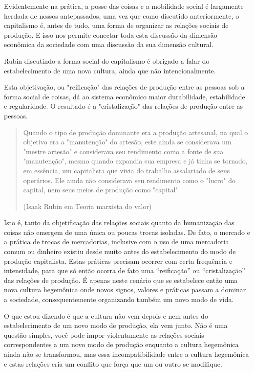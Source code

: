 Evidentemente na prática, a posse das coisas e a mobilidade social é largamente herdada de nossos antepassados, uma vez que como discutido anteriormente, o capitalismo é, antes de tudo, uma forma de organizar as relações sociais de produção. E isso nos permite conectar toda esta discussão da dimensão econômica da sociedade com uma discussão da sua dimensão cultural.

Rubin discutindo a forma social do capitalismo é obrigado a falar do estabelecimento de uma nova cultura, ainda que não intencionalmente.

Esta objetivação, ou "reificação" das relações de produção entre as pessoas sob a forma social de coisas, dá ao sistema econômico maior durabilidade, estabilidade e regularidade. O resultado é a "cristalização" das relações de produção entre as pessoas.

\begin{quote}
Quando o tipo de produção dominante era a produção artesanal, na qual o objetivo era a "manutenção" do artesão, este ainda se considerava um "mestre artesão" e considerava seu rendimento como a fonte de sua "manutenção", mesmo quando expandia sua empresa e já tinha se tornado, em essência, um capitalista que vivia do trabalho assalariado de seus operários. Ele ainda não considerava seu rendimento como o "lucro" do capital, nem seus meios de produção como "capital".

(Isaak Rubin em Teoria marxista do valor)
\end{quote}

Isto é, tanto da objetificação das relações sociais quanto da humanização das coisas não emergem de uma única ou poucas trocas isoladas. De fato, o mercado e a prática de trocas de mercadorias, inclusive com o uso de uma mercadoria comum ou dinheiro existiu desde muito antes do estabelecimento do modo de produção capitalista. Estas práticas precisam ocorrer com certa frequência e intensidade, para que só então ocorra de fato uma “reificação” ou “cristalização” das relações de produção. É apenas neste cenário que se estabelece então uma nova cultura hegemônica onde novos signos, valores e práticas passam a dominar a sociedade, consequentemente organizando também um novo modo de vida.

O que estou dizendo é que a cultura não vem depois e nem antes do estabelecimento de um novo modo de produção, ela vem junto. Não é uma questão simples, você pode impor violentamente as relações sociais correspondentes a um novo modo de produção enquanto a cultura hegemônica ainda não se transformou, mas essa incompatibilidade entre a cultura hegemônica e estas relações cria um conflito que força que um ou outro se modifique.


